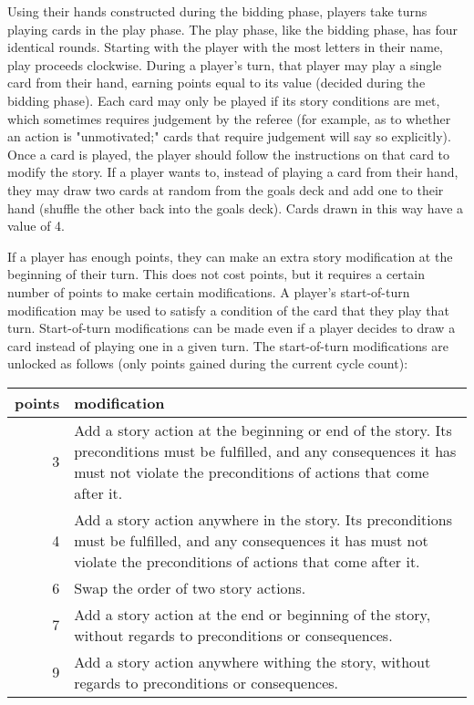 \documentclass[12pt]{article}
\begin{document}
Using their hands constructed during the bidding phase, players take turns playing cards in the play phase.
%
The play phase, like the bidding phase, has four identical rounds.
%
Starting with the player with the most letters in their name, play proceeds clockwise. 
%
During a player's turn, that player may play a single card from their hand, earning points equal to its value (decided during the bidding phase).
%
Each card may only be played if its story conditions are met, which sometimes requires judgement by the referee (for example, as to whether an action is "unmotivated;" cards that require judgement will say so explicitly).
%
Once a card is played, the player should follow the instructions on that card to modify the story.
%
If a player wants to, instead of playing a card from their hand, they may draw two cards at random from the goals deck and add one to their hand (shuffle the other back into the goals deck).
%
Cards drawn in this way have a value of 4.


If a player has enough points, they can make an extra story modification at the beginning of their turn.
%
This does not cost points, but it requires a certain number of points to make certain modifications.
%
A player's start-of-turn modification may be used to satisfy a condition of the card that they play that turn.
%
Start-of-turn modifications can be made even if a player decides to draw a card instead of playing one in a given turn.
%
The start-of-turn modifications are unlocked as follows (only points gained during the current cycle count):

\vspace{1em}
\begin{tabular}{r|p{5in}}
points & modification \\
\midrule
3 & Add a story action at the beginning or end of the story. Its preconditions must be fulfilled, and any consequences it has must not violate the preconditions of actions that come after it. \\
4 & Add a story action anywhere in the story. Its preconditions must be fulfilled, and any consequences it has must not violate the preconditions of actions that come after it. \\
6 & Swap the order of two story actions. \\
7 & Add a story action at the end or beginning of the story, without regards to preconditions or consequences. \\
9 & Add a story action anywhere withing the story, without regards to preconditions or consequences. \\
\end{tabular}
\vspace{0.3em}
\end{document}
